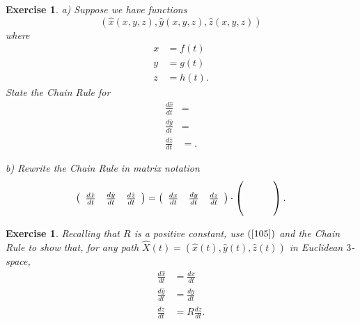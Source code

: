 \documentclass{article}%
\newtheorem{exercise}[theorem]{Exercise}
\begin{document}
\begin{exercise}
a) Suppose we have functions%
\[
\left(  \hat{x}\left(  x,y,z\right)  ,\hat{y}\left(  x,y,z\right)  ,\hat
{z}\left(  x,y,z\right)  \right)
\]
where%
\begin{align*}
x  &  =f\left(  t\right) \\
y  &  =g\left(  t\right) \\
z  &  =h\left(  t\right)  .
\end{align*}
State the Chain Rule for%
\begin{align*}
\frac{d\hat{x}}{dt}  &  =\\
\frac{d\hat{y}}{dt}  &  =\\
\frac{d\hat{z}}{dt}  &  =.
\end{align*}


b) Rewrite the Chain Rule in matrix notation%
\[
\left(
\begin{array}
[c]{ccc}%
\frac{d\hat{x}}{dt} & \frac{d\hat{y}}{dt} & \frac{d\hat{z}}{dt}%
\end{array}
\right)  =\left(
\begin{array}
[c]{ccc}%
\frac{dx}{dt} & \frac{dy}{dt} & \frac{dz}{dt}%
\end{array}
\right)  \cdot\left(
\begin{array}
[c]{ccc}
&  & \\
&  & \\
&  &
\end{array}
\right)  .
\]

\end{exercise}

\begin{exercise}
\label{8} Recalling that $R$ is a positive constant, use $\left(
\ref{105}\right)  $ and the Chain Rule to show that, for any path $\hat
{X}\left(  t\right)  =\left(  \hat{x}\left(  t\right)  ,\hat{y}\left(
t\right)  ,\hat{z}\left(  t\right)  \right)  $ in Euclidean $3$-space,%
\begin{align*}
\frac{d\hat{x}}{dt}  &  =\frac{dx}{dt}\\
\frac{d\hat{y}}{dt}  &  =\frac{dy}{dt}\\
\frac{d\hat{z}}{dt}  &  =R\frac{dz}{dt}.
\end{align*}

\end{exercise}
\end{document}
